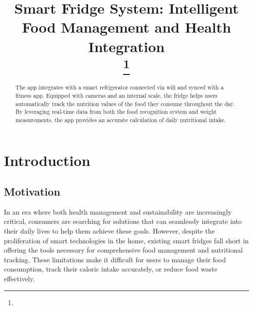 \documentclass[conference]{IEEEtran}
\begin{document}
\title{Smart Fridge System: Intelligent Food Management and Health Integration\\
{\footnotesize \textsuperscript{}}
\thanks{}
}

\author{
\and
{}
\and
{}
\and
{}
}

\maketitle

\begin{abstract}
The app integrates with a smart refrigerator connected via wifi and synced with a fitness app. Equipped with cameras and an internal scale, the fridge helps users automatically track the nutrition values of the food they consume throughout the day. By leveraging real-time data from both the food recognition system and weight measurements, the app provides an accurate calculation of daily nutritional intake.

\end{abstract}

\section{Introduction}
\subsection{Motivation}
In an era where both health management and sustainability are increasingly critical, consumers are searching for solutions that can seamlessly integrate into their daily lives to help them achieve these goals. However, despite the proliferation of smart technologies in the home, existing smart fridges fall short in offering the tools necessary for comprehensive food management and nutritional tracking. These limitations make it difficult for users to manage their food consumption, track their caloric intake accurately, or reduce food waste effectively.
\end{document}
